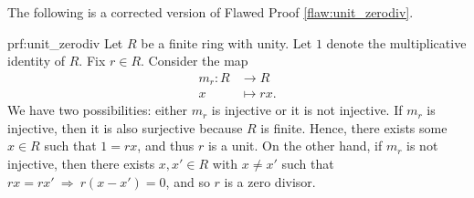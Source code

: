 The following is a corrected version of Flawed Proof \ref{flaw:unit_zerodiv}. %

\begin{prf}{prf:unit_zerodiv} %
Let $R$ be a finite ring with unity.
Let $1$ denote the multiplicative identity of $R$. Fix $r \in R$. Consider the map
\begin{align*}
    m_r: R &\to R\\
    x &\mapsto rx.
\end{align*}
We have two possibilities: either $m_r$ is injective or it is not injective. If $m_r$ is injective, then it is also surjective because $R$ is finite. Hence, there exists some $x \in R$ such that $1 = rx$, and thus $r$ is a unit. On the other hand, if $m_r$ is not injective, then there exists $x, x' \in R$ with $x\neq x'$ such that $rx = rx' \: \Rightarrow \: r(x-x') = 0$, and so $r$ is a zero divisor.

\end{prf} 